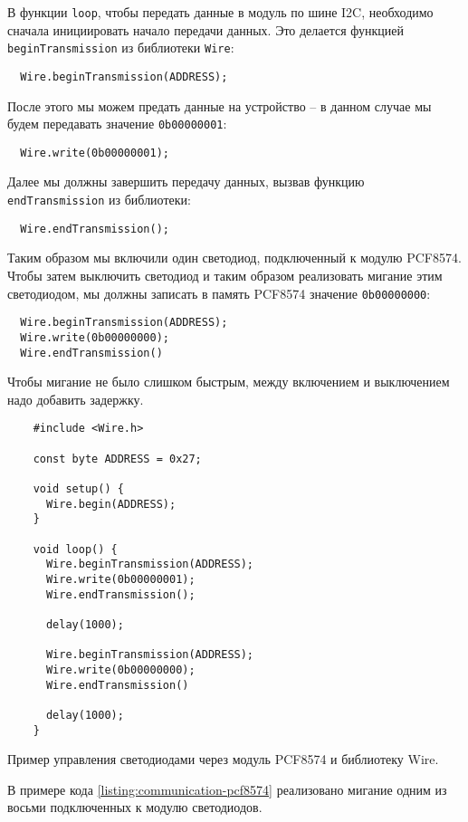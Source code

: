 \documentclass[../sparc.tex]{subfiles}
\begin{document}
В функции \texttt{loop}, чтобы передать данные в модуль по шине I2C, необходимо
сначала инициировать начало передачи данных.  Это делается функцией
\texttt{beginTransmission} из библиотеки \texttt{Wire}:

\begin{verbatim}
  Wire.beginTransmission(ADDRESS);
\end{verbatim}

После этого мы можем предать данные на устройство -- в данном случае мы будем
передавать значение \texttt{0b00000001}:

\begin{verbatim}
  Wire.write(0b00000001);
\end{verbatim}

Далее мы должны завершить передачу данных, вызвав функцию
\texttt{endTransmission} из библиотеки:

\begin{verbatim}
  Wire.endTransmission();
\end{verbatim}

Таким образом мы включили один светодиод, подключенный к модулю PCF8574.  Чтобы
затем выключить светодиод и таким образом реализовать мигание этим светодиодом,
мы должны записать в память PCF8574 значение \texttt{0b00000000}:

\begin{verbatim}
  Wire.beginTransmission(ADDRESS);
  Wire.write(0b00000000);
  Wire.endTransmission()
\end{verbatim}

Чтобы мигание не было слишком быстрым, между включением и выключением надо
добавить задержку.

\begin{listing}[H]
  \begin{verbatim}
    #include <Wire.h>

    const byte ADDRESS = 0x27;

    void setup() {
      Wire.begin(ADDRESS);
    }

    void loop() {
      Wire.beginTransmission(ADDRESS);
      Wire.write(0b00000001);
      Wire.endTransmission();

      delay(1000);

      Wire.beginTransmission(ADDRESS);
      Wire.write(0b00000000);
      Wire.endTransmission()

      delay(1000);
    }
  \end{verbatim}
  \label{listing:communication-pcf8574}
  \caption{Пример управления светодиодами через модуль PCF8574 и библиотеку
    Wire.}
\end{listing}

В примере кода \ref{listing:communication-pcf8574} реализовано мигание одним из
восьми подключенных к модулю светодиодов.
\end{document}
